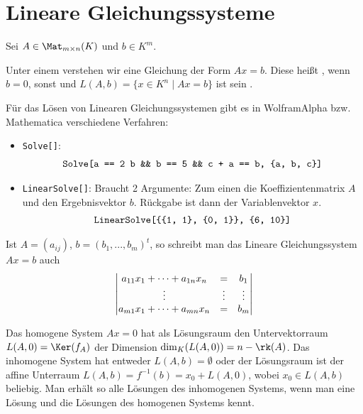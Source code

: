 \section{Lineare Gleichungssysteme}

Sei $A\in \Mat_{m\times n}(K)$ und $b\in K^m$.

\begin{definition}
	Unter einem  verstehen wir eine Gleichung der Form $Ax=b$. 
	Diese heißt , wenn $b=0$, sonst  und $L(A,b)=\{x\in K^n\mid Ax=b\}$ ist sein .
\end{definition}

\begin{mathematica}
	Für das Lösen von Linearen Gleichungssystemen gibt es in WolframAlpha bzw. Mathematica verschiedene Verfahren:
	\begin{itemize}
		\item \texttt{Solve[]}:
		\begin{align}
			\texttt{Solve[a == 2 b \&\& b == 5 \&\& c + a == b, \{a, b, c\}]}\notag
		\end{align}
		\item \texttt{LinearSolve[]}: Braucht 2 Argumente: Zum einen die Koeffizientenmatrix $A$ und den Ergebnisvektor $b$. Rückgabe ist dann der Variablenvektor $x$.
		\begin{align}
			\texttt{LinearSolve[\{\{1, 1\}, \{0, 1\}\}, \{6, 10\}]}\notag
		\end{align}
	\end{itemize}
\end{mathematica}

\begin{remark}
	Ist $A=(a_{ij})$, $b=(b_1,...,b_m)^t$, so schreibt man das Lineare Gleichungssystem $Ax=b$ auch
	\begin{align}
	\begin{vmatrix}
		a_{11}x_1 + \dots + a_{1n}x_n & = & b_1\\
		\vdots & \vdots & \vdots\\
		a_{m1}x_1 + \dots + a_{mn}x_n & = & b_m\\
	\end{vmatrix}\notag
	\end{align}
\end{remark}

\begin{remark}
	Das homogene System $Ax=0$ hat als Lösungsraum den Untervektorraum $L(A,0)=\Ker(f_A)$ der Dimension $\dim_K(L(A,0))=n-\rk(A)$. Das 
	inhomogene System hat entweder $L(A,b)=\emptyset$ oder der Lösungsraum ist der affine Unterraum $L(A,b)=f^{-1}(b)=x_0+L(A,0)$, wobei 
	$x_0\in L(A,b)$ beliebig. Man erhält so alle Lösungen des inhomogenen Systems, wenn man eine Lösung und die Lösungen des homogenen 
	Systems kennt.
\end{remark}

